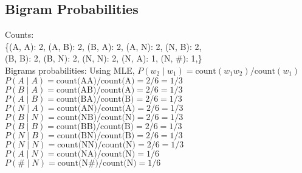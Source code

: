 \documentclass{article}
\begin{document}
\subsection{Bigram Probabilities}
Counts: \\
\{(A, A): 2, (A, B): 2, (B, A): 2, (A, N): 2, (N, B): 2, \\
(B, B): 2, (B, N): 2, (N, N): 2, (N, A): 1, (N, \#): 1,\} \\
Bigrams probabilities:
Using MLE, $P(w_2 \mid w_1) = \text{count}(w_1w_2) / \text{count}(w_1)$\\
$P(A \mid A) = \text{count(AA)} / \text{count(A)} = 2/6 = 1/3$ \\ 
$P(B \mid A) = \text{count(AB)} / \text{count(A)} = 2/6 = 1/3$ \\
$P(A \mid B) = \text{count(BA)} / \text{count(B)} = 2/6 = 1/3$ \\
$P(N \mid A) = \text{count(AN)} / \text{count(A)} = 2/6 = 1/3$ \\
$P(B \mid N) = \text{count(NB)} / \text{count(N)} = 2/6 = 1/3$ \\
$P(B \mid B) = \text{count(BB)} / \text{count(B)} = 2/6 = 1/3$ \\
$P(N \mid B) = \text{count(BN)} / \text{count(B)} = 2/6 = 1/3$ \\
$P(N \mid N) = \text{count(NN)} / \text{count(N)} = 2/6 = 1/3$ \\
$P(A \mid N) = \text{count(NA)} / \text{count(N)} = 1/6$ \\
$P(\# \mid N) = \text{count(N\#}) / \text{count(N)} = 1/6$ \\
\end{document}
